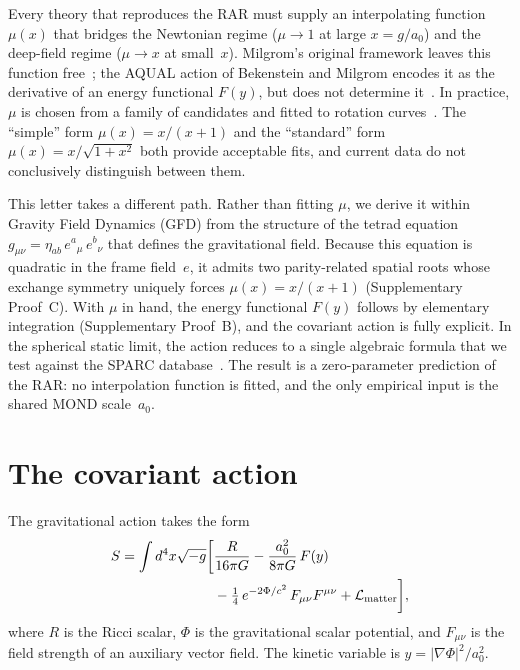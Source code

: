 \documentclass[twocolumn]{iopjournal}
\begin{document}
Every theory that reproduces the RAR must supply an interpolating
function $\mu(x)$ that bridges the Newtonian regime ($\mu \to 1$
at large $x = g/a_0$) and the deep-field regime ($\mu \to x$ at
small~$x$).  Milgrom's original framework leaves this function
free~\cite{Milgrom1983}; the AQUAL action of Bekenstein and
Milgrom encodes it as the derivative of an energy functional
$F(y)$, but does not determine
it~\cite{BekensteinMilgrom1984}.  In practice, $\mu$ is chosen
from a family of candidates and fitted to rotation
curves~\cite{FamaeyMcGaugh2012,FamaeyBinney2005}.  The
``simple'' form $\mu(x) = x/(x+1)$ and the ``standard'' form
$\mu(x) = x/\sqrt{1+x^2}$ both provide acceptable fits, and
current data do not conclusively distinguish between them.

This letter takes a different path.  Rather than fitting $\mu$,
we derive it within Gravity Field Dynamics (GFD) from the
structure of the tetrad equation
$g_{\mu\nu} = \eta_{ab}\,e^a{}_\mu\,e^b{}_\nu$ that defines the
gravitational field.  Because this equation is quadratic in the
frame field~$e$, it admits two parity-related spatial roots whose
exchange symmetry uniquely forces
$\mu(x) = x/(x+1)$ (Supplementary Proof~C).  With $\mu$ in
hand, the energy functional $F(y)$ follows by elementary
integration (Supplementary Proof~B), and the covariant action
is fully explicit.  In the spherical static limit, the action
reduces to a single algebraic formula that we test against the
SPARC database~\cite{Lelli2016}.  The result is a zero-parameter
prediction of the RAR: no interpolation function is fitted, and
the only empirical input is the shared MOND scale~$a_0$.


\section{The covariant action}

The gravitational action takes the form
\begin{equation}
\begin{split}
  S = \int d^4x \sqrt{-g}\bigg[
    &\frac{R}{16\pi G}
    - \frac{a_0^2}{8\pi G}\,F(y) \\
    &- \tfrac{1}{4}\,e^{-2\Phi/c^2}\,
      F_{\mu\nu}F^{\mu\nu}
    + \mathcal{L}_{\rm matter}
  \bigg],
\end{split}
  \label{eq:action}
\end{equation}
where $R$ is the Ricci scalar, $\Phi$ is the gravitational
scalar potential, and $F_{\mu\nu}$ is the field strength of an
auxiliary vector field.  The kinetic variable is
$y = |\nabla\Phi|^2/a_0^2$.
\end{document}
